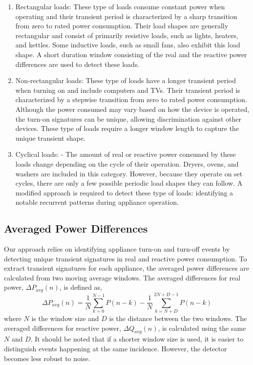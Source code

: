 \documentclass[conference]{IEEEtran}
\begin{document}
\begin{enumerate}
\item{Rectangular loads:} These type of loads consume constant power when operating and their transient period is characterized by a sharp transition from zero to rated power consumption.  Their load shapes are generally rectangular and consist of primarily resistive loads, such as lights, heaters, and kettles.  Some inductive loads, such as small fans, also exhibit this load shape.  A short duration window consisting of the real and the reactive power differences are used to detect these loads.
\newline
\item{Non-rectangular loads:} These type of loads have a longer transient period when turning on and include computers and TVs.  Their transient period is characterized by a stepwise transition from zero to rated power consumption.  Although the power consumed may vary based on how the device is operated, the turn-on signatures can be unique, allowing discrimination against other devices.  These type of loads require a longer window length to capture the unique transient shape.
\newline
\item{Cyclical loads:} - The amount of real or reactive power consumed by these loads change depending on the cycle of their operation.  Dryers, ovens, and washers are included in this category.   However, because they operate on set cycles, there are only a few possible periodic load shapes they can follow.  A modified approach is required to detect these type of loads: identifying a notable recurrent patterns during appliance operation.
\end{enumerate}


\subsection{Averaged Power Differences}
Our approach relies on identifying appliance turn-on and turn-off events by detecting unique transient signatures in real and reactive power consumption. To extract transient signatures for each appliance, the averaged power differences are calculated from two moving average windows.  The averaged differences for real power, $\Delta P_{avg}(n)$, is defined as,
\begin{equation}
\Delta P_{avg}(n) = \frac{1}{N}\sum_{k=0}^{N-1}P(n-k) - \frac{1}{N}\sum_{k=N+D}^{2N+D-1}P(n-k)
\end{equation}
where $N$ is the window size and $D$ is the distance between the two windows.  The averaged differences for reactive power, $\Delta Q_{avg}(n)$, is calculated using the same $N$ and $D$.  It should be noted that if a shorter window size is used, it is easier to distinguish events happening at the same incidence.  However, the detector becomes less robust to noise.
\end{document}

